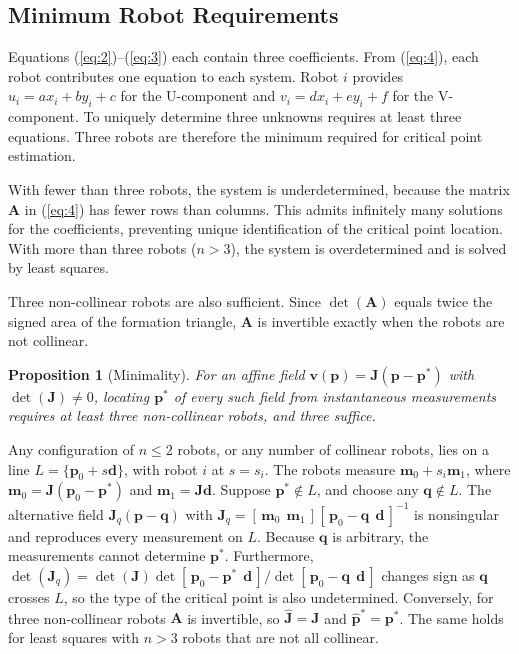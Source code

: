 \documentclass[lettersize,journal]{IEEEtran}
\newtheorem{proposition}{Proposition}
\begin{document}
\subsection{Minimum Robot Requirements}

Equations (\ref{eq:2})--(\ref{eq:3}) each contain three coefficients. From (\ref{eq:4}), each robot contributes one equation to each system. Robot $i$ provides $u_i = ax_i + by_i + c$ for the U-component and $v_i = dx_i + ey_i + f$ for the V-component. To uniquely determine three unknowns requires at least three equations. Three robots are therefore the minimum required for critical point estimation.

With fewer than three robots, the system is underdetermined, because the matrix $\mathbf{A}$ in (\ref{eq:4}) has fewer rows than columns. This admits infinitely many solutions for the coefficients, preventing unique identification of the critical point location. With more than three robots ($n > 3$), the system is overdetermined and is solved by least squares.

Three non-collinear robots are also sufficient. Since $\det(\mathbf{A})$ equals twice the signed area of the formation triangle, $\mathbf{A}$ is invertible exactly when the robots are not collinear.

\begin{proposition}[Minimality]\label{prop:min}
For an affine field $\mathbf{v}(\mathbf{p}) = \mathbf{J}(\mathbf{p}-\mathbf{p}^*)$ with $\det(\mathbf{J}) \neq 0$, locating $\mathbf{p}^*$ of every such field from instantaneous measurements requires at least three non-collinear robots, and three suffice.
\end{proposition}

\begin{IEEEproof}
Any configuration of $n \le 2$ robots, or any number of collinear robots, lies on a line $L = \{\mathbf{p}_0 + s\mathbf{d}\}$, with robot $i$ at $s = s_i$. The robots measure $\mathbf{m}_0 + s_i\mathbf{m}_1$, where $\mathbf{m}_0 = \mathbf{J}(\mathbf{p}_0 - \mathbf{p}^*)$ and $\mathbf{m}_1 = \mathbf{J}\mathbf{d}$. Suppose $\mathbf{p}^* \notin L$, and choose any $\mathbf{q} \notin L$. The alternative field $\mathbf{J}_q(\mathbf{p} - \mathbf{q})$ with $\mathbf{J}_q = [\,\mathbf{m}_0\ \ \mathbf{m}_1\,][\,\mathbf{p}_0 - \mathbf{q}\ \ \mathbf{d}\,]^{-1}$ is nonsingular and reproduces every measurement on $L$. Because $\mathbf{q}$ is arbitrary, the measurements cannot determine $\mathbf{p}^*$. Furthermore, $\det(\mathbf{J}_q) = \det(\mathbf{J})\det[\,\mathbf{p}_0 - \mathbf{p}^*\ \ \mathbf{d}\,]/\det[\,\mathbf{p}_0 - \mathbf{q}\ \ \mathbf{d}\,]$ changes sign as $\mathbf{q}$ crosses $L$, so the type of the critical point is also undetermined. Conversely, for three non-collinear robots $\mathbf{A}$ is invertible, so $\hat{\mathbf{J}} = \mathbf{J}$ and $\hat{\mathbf{p}}^* = \mathbf{p}^*$. The same holds for least squares with $n > 3$ robots that are not all collinear.
\end{IEEEproof}
\end{document}

